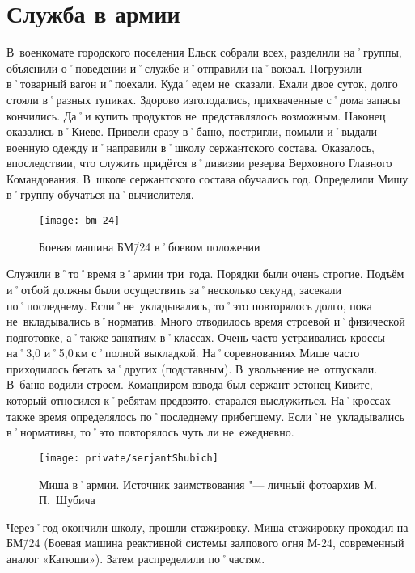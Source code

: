 ﻿\chapter{Служба в армии}
В~военкомате городского поселения Ельск собрали всех, разделили на˚группы, объяснили о˚поведении и˚службе и˚отправили на˚вокзал. Погрузили в˚товарный вагон и˚поехали. Куда˚едем не~сказали. Ехали двое суток, долго стояли в˚разных тупиках. Здорово изголодались, прихваченные с˚дома запасы кончились. Да˚и купить продуктов не~представлялось возможным. Наконец оказались в˚Киеве. Привели сразу в˚баню, постригли, помыли и˚выдали военную одежду и˚направили в˚школу сержантского состава. Оказалось, впоследствии, что служить придётся в˚дивизии резерва Верховного Главного Командования. В~школе сержантского состава обучались год. Определили Мишу в˚группу обучаться на˚вычислителя.

\begin{wrapfigure}{O}{.4\textwidth}
\centering
\texttt{[image: bm-24]}
\caption[Боевая машина БМ\=/24 в˚боевом положении]{Боевая машина БМ\=/24 в˚боевом положении\footnotemark}
\label{fig:bm-24}
\end{wrapfigure}

Служили в˚то˚время в˚армии три~года. Порядки были очень строгие. Подъём и˚отбой должны были осуществить за˚несколько секунд, засекали по˚последнему. Если˚не~укладывались, то˚это повторялось долго, пока не~вкладывались в˚норматив. Много отводилось время строевой и˚физической подготовке, а˚также занятиям в˚классах. Очень часто устраивались кроссы на˚3,0 и˚5,0\,км с˚полной выкладкой. На˚соревнованиях Мише часто приходилось бегать за˚других (подставным). В~увольнение не~отпускали. В~баню водили строем. Командиром взвода был сержант эстонец Кивитс, который относился к˚ребятам предвзято, старался выслужиться. На˚кроссах также время определялось по˚последнему прибегшему. Если˚не~укладывались в˚нормативы, то˚это повторялось чуть ли не~ежедневно.


\begin{figure}[H]
\texttt{[image: private/serjantShubich]}
\caption{Миша в˚армии. Источник заимствования "--- личный фотоархив М.\,П.~Шубича}
\label{fig:serjantShubich}
\end{figure}


Через˚год окончили школу, прошли стажировку. Миша стажировку проходил на БМ\=/24 (Боевая машина реактивной системы залпового огня М-24, современный аналог «Катюши»). Затем распределили по˚частям. 

